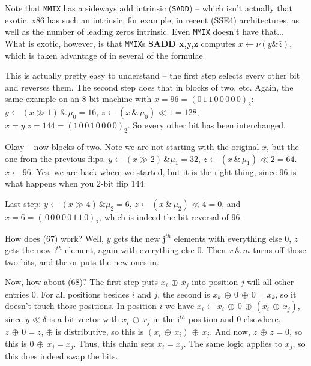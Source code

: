 \vskip 0.1in 

\noindent [p 143] Note that {\tt MMIX} has a sideways add intrinsic
({\tt SADD}) -- which isn't actually that exotic.  x86 has such an intrinsic,
for example, in recent (SSE4) architectures, as well as the number of
leading zeros intrinsic.  Even {\tt MMIX} doesn't have that...  What
is exotic, however, is that {\tt MMIX}s {\bf SADD x,y,z}
computes $x \gets \nu \! \left(y \& \bar{z}\right)$, which is
taken advantage of in several of the formulae.

\vskip 0.1in 

\noindent [p 144] 
This is actually pretty easy to understand -- the
first step selects every other bit and reverses them.
The second step does that in blocks of two, etc.
Again, the same example on an 8-bit machine
with $x = 96 = \left(0\,1\,1\,0\,0\,0\,0\,0\right)_2$:
$y \gets \left(x \gg 1\right) \, \& \, \mu_0 = 16$,
$z \gets \left(x \, \& \, \mu_0\right) \ll 1 = 128$,
$x = y | z = 144 = \left(1\,0\,0\,1\,0\,0\,0\,0\right)_2$.
So every other bit has been interchanged.

Okay -- now blocks of two.  Note we are
not starting with the original $x$, but the one
from the previous flips.
$y \gets \left(x \gg 2\right) \, \& \mu_1 = 32$,
$z \gets \left(x \, \& \, \mu_1\right) \ll 2 = 64$.
$x \gets 96$.  Yes, we are back where we started,
but it is the right thing, since 96 is what happens when
you 2-bit flip 144.  

Last step: $y \gets \left(x \gg 4\right) \, \& \mu_2 = 6$,
$z \gets \left(x \, \& \, \mu_2\right) \ll 4 = 0$,
and $x = 6 = \left(\,0\,0\,0\,0\,0\,1\,1\,0\right)_2$,
which is indeed the bit reversal of 96.

\vskip 0.1in 
\noindent [p 144] How does (67) work?\hfil\break
Well, $y$ gets the new j$^{th}$ elements with everything
else 0, $z$ gets the new i$^{th}$ element, again with
everything else 0.  Then $x \, \& \, m$ turns off those two
bits, and the or puts the new ones in.

\vskip 0.08in \noindent [p 145] Now, how about (68)?\hfil\break
The first step puts $x_i \, \oplus \, x_j$ into position $j$ will all
other entries 0.  For all positions besides $i$ and $j$, the second
is $x_k \, \oplus \, 0 \, \oplus \, 0 = x_k$, so it doesn't touch those
positions.  In position $i$ we have $x_i \gets x_i \, \oplus \, 0 \, \oplus \,
\left(x_i \, \oplus \, x_j\right)$, since $y \ll \delta$ is a bit vector
with $x_i \, \oplus \, x_j$ in the i$^{th}$ position and 0 elsewhere.
$z \, \oplus \, 0 = z$, $\oplus$ is distributive, so this is
$\left(x_i \, \oplus \, x_i\right) \, \oplus \, x_j$.  And now, 
$z \, \oplus \, z = 0$, so this is $0 \, \oplus \, x_j = x_j$.
Thus, this chain sets $x_i = x_j$.  The same logic applies
to $x_j$, so this does indeed swap the bits.

